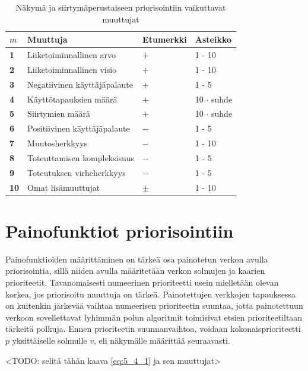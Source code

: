   \begin{table}[H]
    \caption{Näkymä ja siirtymäperustaiseen priorisointiin vaikuttavat muuttujat}
    \label{tab:priorisointiin_vaikuttavat_muuttujat}
    \centering
    \begin{tabular}{l|l|l|l} \hline
    \(m\) & \textbf{Muuttuja} & \textbf{Etumerkki} & \textbf{Asteikko} \\ \hline
    \textbf{1} & Liiketoiminnallinen arvo & \(+\) & 1 - 10 \\
    \textbf{2} & Liiketoiminnallinen visio & \(+\) & 1 - 10 \\
    \textbf{3} & Negatiivinen käyttäjäpalaute & \(+\) & 1 - 5 \\
    \textbf{4} & Käyttötapauksien määrä & \(+\) & 10 \(\cdot\) suhde  \\
    \textbf{5} & Siirtymien määrä & \(+\) & 10 \(\cdot\) suhde  \\
    \textbf{6} & Positiivinen käyttäjäpalaute & \(-\) & 1 - 5  \\
    \textbf{7} & Muutosherkkyys & \(-\) & 1 - 10  \\
    \textbf{8} & Toteuttamisen kompleksisuus & \(-\) & 1 - 5  \\
    \textbf{9} & Toteutuksen virheherkkyys & \(-\) & 1 - 5  \\
    \textbf{10} & Omat lisämuuttujat & \(\pm\) & 1 - 10 \\ \hline
    \end{tabular}
  \end{table}

\section{Painofunktiot priorisointiin} \label{ch:10_painofunktiot_priorisointiin}

  Painofunktioiden määrittäminen on tärkeä osa painotetun verkon avulla priorisointia, sillä niiden avulla määritetään verkon solmujen ja kaarien prioriteetit.
  Tavanomaisesti numeerinen prioriteetti usein mielletään olevan korkea, jos priorisoitu muuttuja on tärkeä.
  Painotettujen verkkojen tapauksessa on kuitenkin järkevää vaihtaa numeerisen prioriteetin suuntaa, jotta painotettuun verkoon sovellettavat lyhimmän polun algoritmit toimisivat etsien prioriteetiltaan tärkeitä polkuja.
  Ennen prioriteetin suunnanvaihtoa, voidaan kokonaisprioriteetti \(p\) yksittäiselle solmulle \(v\), eli näkymälle määrittää seuraavasti.

  <TODO: selitä tähän kaava \ref{eq:5_4_1} ja sen muuttujat>

